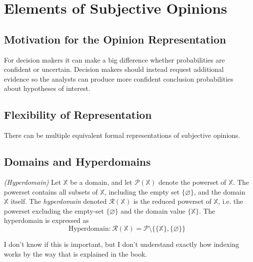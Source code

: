 
\section{Elements of Subjective Opinions}

\subsection{Motivation for the Opinion Representation}

For decision makers it can make a big difference whether probabilities are confident or uncertain. Decision makers should instead request additional evidence so the analysts can produce more confident conclusion probabilities
about hypotheses of interest.

\subsection{Flexibility of Representation}

There can be multiple equivalent formal representations of subjective opinions.

\subsection{Domains and Hyperdomains}

\begin{definition}
	 \emph{(Hyperdomain)} Let $\mathbb{X}$ be a domain, and let $\mathcal{P}(\mathbb{X})$ denote the powerset of $\mathbb{X}$. The powerset contains all subsets of $\mathbb{X}$, including the empty set $\{\varnothing\}$, and the domain $\mathbb{X}$ itself. The \emph{hyperdomain} denoted $\mathcal{R}(\mathbb{X})$ is the reduced powerset of $\mathbb{X}$, i.e. the powerset excluding the empty-set $\{\varnothing\}$ and the domain value $\{\mathbb{X}\}$. The hyperdomain is expressed as
	\begin{equation}
		\text{Hyperdomain:}\ \mathcal{R}(\mathbb{X}) = \mathcal{P} \setminus \{\{\mathbb{X}\}, \{\varnothing\}\}
	\end{equation}
\end{definition}

\begin{question}
	I don't know if this is important, but I don't understand exactly how indexing works by the way that is explained in the book.
\end{question}

